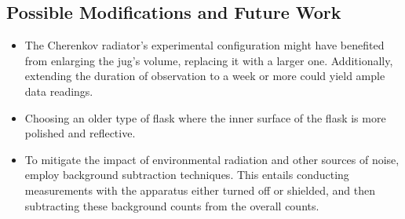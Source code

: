 \documentclass{article}
\begin{document}
\begin{multicols}{2}
\subsection{Possible Modifications and Future Work}

\begin{itemize}
    \item The Cherenkov radiator's experimental configuration might have benefited from enlarging the jug's volume, replacing it with a larger one. Additionally, extending the duration of observation to a week or more could yield ample data readings.
    \item Choosing an older type of flask where the inner surface of the flask is more polished and reflective.
    \item To mitigate the impact of environmental radiation and other sources of noise, employ background subtraction techniques. This entails conducting measurements with the apparatus either turned off or shielded, and then subtracting these background counts from the overall counts.
\end{itemize}






\end{multicols}


\end{document}
